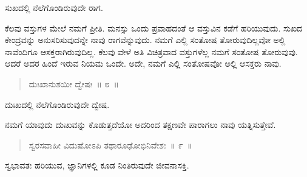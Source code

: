ಸುಖದಲ್ಲಿ ನೆಲೆಗೊಂಡಿರುವುದೇ ರಾಗ. 

ಕೆಲವು ವಸ್ತುಗಳ ಮೇಲೆ ನಮಗೆ ಪ್ರೀತಿ. ಮನಸ್ಸು ಒಂದು ಪ್ರವಾಹದಂತೆ ಆ ವಸ್ತುವಿನ ಕಡೆಗೆ ಹರಿಯುವುದು. ಸುಖದ ಕೇಂದ್ರವನ್ನು ಅನುಸರಿಸುವುದನ್ನೇ ನಾವು ರಾಗವೆನ್ನುವುದು. ನಮಗೆ ಎಲ್ಲಿ ಸಂತೋಷ ತೋರುವುದಿಲ್ಲವೋ ಅಲ್ಲಿ ನಾವೆಂದಿಗೂ ಆಸಕ್ತರಾಗಿರುವುದಿಲ್ಲ. ಕೆಲವು ವೇಳೆ ಅತಿ ವಿಚಿತ್ರವಾದ ವಸ್ತುಗಳೆಲ್ಲ ನಮಗೆ ಸಂತೋಷ ತೋರುವುವು. ಆದರೆ ಅದರ ಹಿಂದೆ ಇರುವ ನಿಯಮ ಒಂದೇ. ಅದೇ, ನಮಗೆ ಎಲ್ಲಿ ಸಂತೋಷವೋ ಅಲ್ಲಿ ಆಸಕ್ತರು ನಾವು. 

\vspace{-0.3cm}

\begin{verse}
ದುಃಖಾನುಶಯೀ ದ್ವೇಷಃ~॥ ೮~॥
\end{verse}

\vspace{-0.3cm}

ದುಃಖದಲ್ಲಿ ನೆಲೆಗೊಂಡಿರುವುದೇ ದ್ವೇಷ. 

ನಮಗೆ ಯಾವುದು ದುಃಖವನ್ನು ಕೊಡುತ್ತದೆಯೋ ಅದರಿಂದ ತಕ್ಷಣವೇ ಪಾರಾಗಲು ನಾವು ಯತ್ನಿಸುತ್ತೇವೆ. 

\vspace{-0.3cm}

\begin{verse}
ಸ್ವರಸವಾಹೀ ವಿದುಷೋಽಪಿ ತಥಾರೂಢೋಭಿನಿವೇಶಃ~॥ ೯~॥
\end{verse}

\vspace{-0.3cm}

ಸ್ವಭಾವತಃ ಹರಿಯುವ, ಜ್ಞಾನಿಗಳಲ್ಲಿ ಕೂಡ ನಿಂತಿರುವುದೇ ಜೀವನಾಸಕ್ತಿ. 

